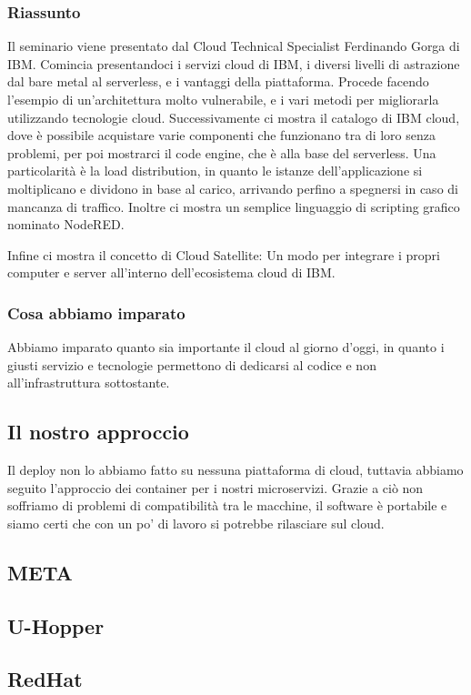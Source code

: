 \documentclass{report}
\begin{document}
\subsubsection*{Riassunto}
Il seminario viene  presentato dal Cloud Technical Specialist Ferdinando Gorga di IBM.
Comincia presentandoci i servizi cloud di IBM, i diversi livelli di astrazione dal bare metal al serverless, e i vantaggi della piattaforma.
Procede facendo l'esempio di un'architettura molto vulnerabile, e i vari metodi per migliorarla utilizzando tecnologie cloud.
Successivamente ci mostra il catalogo di IBM cloud, dove è possibile acquistare varie componenti che funzionano tra di loro senza problemi, per poi mostrarci il code engine, che è alla base del serverless. Una particolarità è la load distribution, in quanto le istanze dell'applicazione si moltiplicano e dividono in base al carico,
arrivando perfino a spegnersi in caso di mancanza di traffico. 
Inoltre ci mostra un semplice linguaggio di scripting grafico nominato NodeRED.

Infine ci mostra il concetto di Cloud Satellite: Un modo per integrare i propri computer e server all'interno dell'ecosistema cloud di IBM.
\subsubsection*{Cosa abbiamo imparato}
Abbiamo imparato quanto sia importante il cloud al giorno d'oggi, in quanto i giusti servizio e tecnologie permettono di dedicarsi al codice e non all'infrastruttura sottostante.
\subsection*{Il nostro approccio}
Il deploy non lo abbiamo fatto su nessuna piattaforma di cloud, tuttavia abbiamo seguito l'approccio dei container per i nostri microservizi. 
Grazie a ciò non soffriamo di problemi di compatibilità tra le macchine, il software è portabile e siamo certi che con un po' di lavoro si potrebbe rilasciare sul cloud.

\subsection{META}

\subsection{U-Hopper}

\subsection{RedHat}
\end{document}
